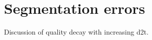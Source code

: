 \section{Segmentation errors}
\label{sec:data_errors_segmentation}
Discussion of quality decay with increasing d2t.





